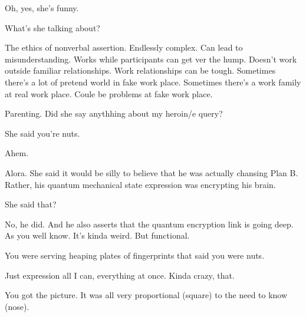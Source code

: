 

Oh, yes, she's funny.

What's she talking about?

The ethics of nonverbal assertion.  Endlessly complex.  Can lead to
misunderstanding.  Works while participants can get ver the hump.
Doesn't work outside familiar relationships.  Work relationships can
be tough.  Sometimes there's a lot of pretend world in fake work
place.  Sometimes there's a work family at real work place.  Coule be
problems at fake work place.

Parenting.  Did she say anythhing about my heroin/e query?  

She said you're nuts.

Ahem.

Alora.  She said it would be silly to believe that he was actually
chansing Plan B.  Rather, his quantum mechanical state expression was
encrypting his brain.

She said that?

No, he did.  And he also asserts that the quantum encryption link is
going deep.  As you well know.  It's kinda weird.  But functional.

You were serving heaping plates of fingerprints that said you were
nuts.  

Just expression all I can, everything at once.  Kinda crazy, that.

You got the picture.  It was all very proportional (square) to the
need to know (nose).

\bye
